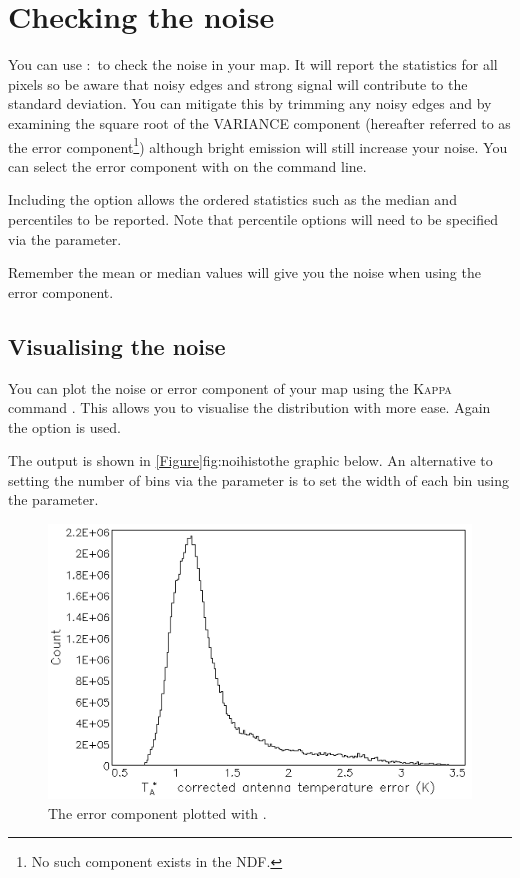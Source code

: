 \documentclass[11pt,oneside,chapters]{starlink}
\begin{document}
\section{Checking the noise}
\label{sec:noise}

You can use \Kappa:\stats\ to check the noise in your map. It will
report the statistics for all pixels so be aware that noisy edges and
strong signal will contribute to the standard deviation. You can
mitigate this by trimming any noisy edges and by examining the square
root of the VARIANCE component (hereafter referred to as the error
component\footnote{No such component exists in the NDF.}) although
bright emission will still increase your noise. You can select the
error component with  on the command line.
\begin{terminalv}
\end{terminalv}
Including the option  allows the ordered statistics such
as the median and percentiles to be reported. Note that percentile
options will need to be specified via the 
parameter.

\begin{tip}
Remember the mean or median values will give you the noise when
using the error component.
\end{tip}

\subsection{Visualising the noise}

You can plot the noise or error component of your map using the
\textsc{Kappa} command \histogram. This allows you to visualise the
distribution with more ease. Again the  option is
used.
\begin{terminalv}
\end{terminalv}
The output is shown in \cref{Figure}{fig:noihisto}{the graphic below}.
An alternative to setting the number of bins via the 
parameter is to set the width of each bin using the 
parameter.

\begin{figure}[h!]
\begin{center}
\includegraphics[width=0.6\linewidth]{sc20_noihisto1}
\caption[
  A histogram of the error component.]{\label{fig:noihisto}
  The error component plotted with \histogram.}
\end{center}
\end{figure}
\end{document}
